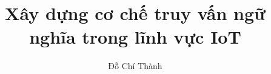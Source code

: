 \documentclass[a4paper,12pt,3p]{report}
\begin{document}
\title{\LARGE {\bf Xây dựng cơ chế truy vấn ngữ nghĩa trong lĩnh vực IoT}\\
 \vspace*{7mm}
}


\author{Đỗ Chí Thành}




\normallinespacing
\maketitle

\preface






\body








%
%


%
%
%
%
\end{document}
